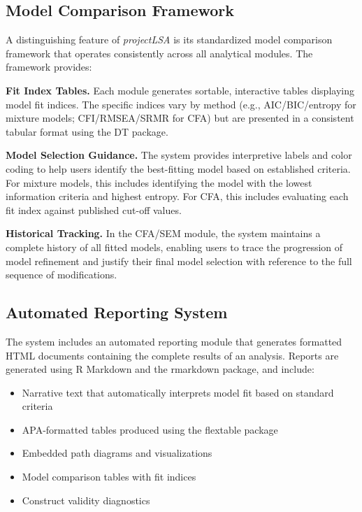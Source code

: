 \documentclass[12pt,a4paper]{article}
\begin{document}
\subsection{Model Comparison Framework}

A distinguishing feature of \textit{projectLSA} is its standardized model comparison framework that operates consistently across all analytical modules. The framework provides:

\textbf{Fit Index Tables.} Each module generates sortable, interactive tables displaying model fit indices. The specific indices vary by method (e.g., AIC/BIC/entropy for mixture models; CFI/RMSEA/SRMR for CFA) but are presented in a consistent tabular format using the DT package.

\textbf{Model Selection Guidance.} The system provides interpretive labels and color coding to help users identify the best-fitting model based on established criteria. For mixture models, this includes identifying the model with the lowest information criteria and highest entropy. For CFA, this includes evaluating each fit index against published cut-off values.

\textbf{Historical Tracking.} In the CFA/SEM module, the system maintains a complete history of all fitted models, enabling users to trace the progression of model refinement and justify their final model selection with reference to the full sequence of modifications.

\subsection{Automated Reporting System}

The system includes an automated reporting module that generates formatted HTML documents containing the complete results of an analysis. Reports are generated using R Markdown and the rmarkdown package, and include:

\begin{itemize}[nosep, leftmargin=3em]
\item Narrative text that automatically interprets model fit based on standard criteria
\item APA-formatted tables produced using the flextable package
\item Embedded path diagrams and visualizations
\item Model comparison tables with fit indices
\item Construct validity diagnostics
\end{itemize}
\end{document}
